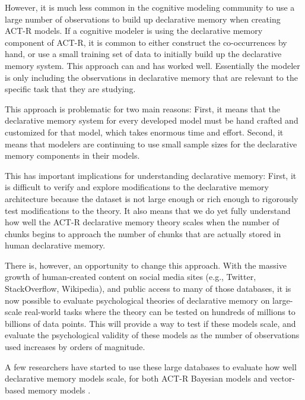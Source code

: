 \documentclass[man,floatsintext,donotrepeattitle]{apa6}
\begin{document}
However, it is much less common in the cognitive modeling community to use a large number of observations to build up declarative memory when creating ACT-R models.
If a cognitive modeler is using the declarative memory component of ACT-R,
it is common to either construct the co-occurrences by hand, or use a small training set of data to initially build up the declarative memory system.
This approach can and has worked well.
Essentially the modeler is only including the observations in declarative memory that are relevant to the specific task that they are studying.

This approach is problematic for two main reasons:
First, it means that the declarative memory system for every developed model must be hand crafted and customized for that model, which takes enormous time and effort.
Second, it means that modelers are continuing to use small sample sizes for the declarative memory components in their models.

This has important implications for understanding declarative memory:
First, it is difficult to verify and explore modifications to the declarative memory architecture because the dataset is not large enough or rich enough to rigorously test modifications to the theory.
It also means that we do yet fully understand how well the ACT-R declarative memory theory scales when the number of chunks begins to approach the number of chunks that are actually stored in human declarative memory.

There is, however, an opportunity to change this approach.
With the massive growth of human-created content on social media sites (e.g., Twitter, StackOverflow, Wikipedia), and public access to many of those databases,
it is now possible to evaluate psychological theories of declarative memory on large-scale real-world tasks where the theory can be tested on hundreds of millions to billions of data points.
This will provide a way to test if these models scale, and evaluate the psychological validity of these models as the number of observations used increases by orders of magnitude.

A few researchers have started to use these large databases to evaluate how well declarative memory models scale,
for both ACT-R Bayesian models \parencites{Fu2007,Pirolli2003,Stanley2013,Douglass2010} and vector-based memory models \parencites{Jones2007,Rutledge2008,Recchia2010,Sahlgren2008}.
\end{document}
